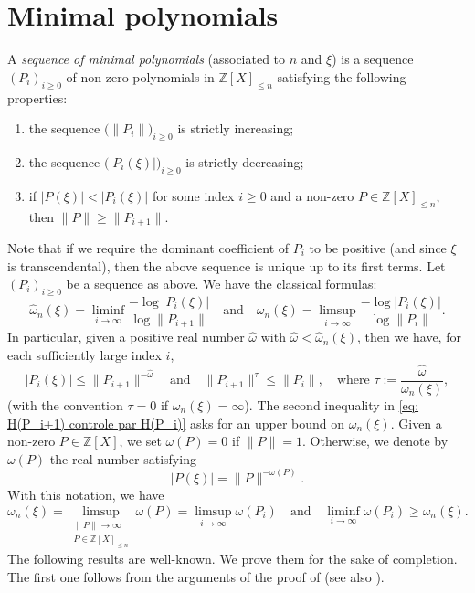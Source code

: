 \documentclass[JEP,XML,SOM,Unicode,NoFloatCountersInSection,published]{cedram}
\newcommand\bZ{\mathbb{Z}}
\newcommand\homega{\widehat{\omega}}\newcommand\HH{\mathcal{H}}
\newcommand{\normH}[1]{\|#1\|}
\newcommand\AND{\quad\text{and}\quad}
\theoremstyle{definition}
\theoremstyle{plain}
\begin{document}
\section{Minimal polynomials}
\label{section: minimal pol}

A \emph{sequence of minimal polynomials} (associated to $n$ and $\xi$) is a sequence $(P_i)_{i\geq 0}$ of non-zero polynomials in $\bZ[X]_{\leq n}$ satisfying the following properties:
\begin{enumerate}
\item the sequence $\big(\normH{P_i}\big)_{i\geq 0}$ is strictly increasing;
\item the sequence $\big(|P_i(\xi)|\big)_{i\geq 0}$ is strictly decreasing;
\item if $|P(\xi)| < |P_i(\xi)|$ for some index $i\geq 0$ and a non-zero $P\in\bZ[X]_{\leq n}$, then $\normH{P}\geq \normH{P_{i+1}}$.
\end{enumerate}

Note that if we require the dominant coefficient of $P_i$ to be positive (and since $\xi$ is transcendental), then the above sequence is unique up to its first terms. Let $(P_i)_{i\geq 0}$ be a sequence as above. We have the classical formulas:
\begin{equation}
\label{eq: exposant via minimal points}
\homega_n(\xi) = \liminf_{i\to \infty} \frac{-\log |P_i(\xi)|}{\log \normH{P_{i+1}}} \AND \omega_n(\xi) = \limsup_{i\to \infty} \frac{-\log |P_i(\xi)|}{\log \normH{P_{i}}}.
\end{equation}
In particular, given a positive real number $\homega$ with $\homega < \homega_n(\xi)$, then we have, for each sufficiently large index $i$,
\begin{equation}
\label{eq: H(P_i+1) controle par H(P_i)}
|P_i(\xi)| \leq \normH{P_{i+1}}^{-\homega} \AND \normH{P_{i+1}}^\tau \leq \normH{P_i},\quad \textrm{where } \tau:= \frac{\homega}{\omega_n(\xi)},
\end{equation}
(with the convention $\tau = 0$ if $\omega_n(\xi) = \infty$). The second inequality in \eqref{eq: H(P_i+1) controle par H(P_i)} asks for an upper bound on $\omega_n(\xi)$. Given a non-zero $P \in \bZ[X]$, we set $\omega(P)=0$ if $\normH{P} = 1$. Otherwise, we denote by $\omega(P)$ the real number satisfying
\[
|P(\xi)| = \normH{P}^{-\omega(P)}.
\]
With this notation, we have
\begin{equation}
\label{eq: encadrement omega(P_i)}
\omega_n(\xi) = \limsup_{\substack{\normH{P}\to \infty \\ P\in\bZ[X]_{\leq n}}} \omega(P) = \limsup_{i\to \infty} \omega(P_i) \AND \liminf_{i\to \infty} \omega(P_i) \geq \homega_n(\xi).
\end{equation}
The following results are well-known. We prove them for the sake of completion. The first one follows from the arguments of the proof of \cite[Lem.\,2]{davenport1967approximation} (see also \cite[Lem.\,4.1]{roy2004approximation}).
\end{document}
